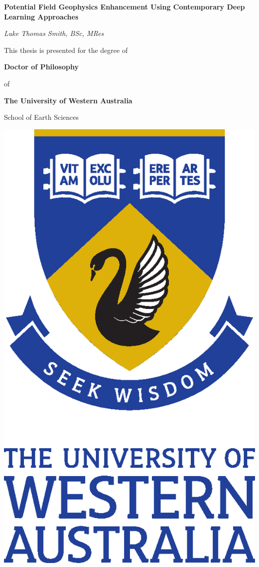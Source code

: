 \documentclass[12pt,a4paper]{report} %
\begin{document}
\begin{titlepage}
    \centering
        
        \vspace*{48 pt}
        {\large\textbf{Potential Field Geophysics Enhancement Using Contemporary Deep Learning Approaches}}

        \vspace{48 pt}
        {\itshape{{\Large Luke Thomas Smith}, BSc, MRes}}

        \vspace{48 pt}
        This thesis is presented for the degree of

        \vspace{14 pt}
        \textbf{Doctor of Philosophy}

        of

        \textbf{The University of Western Australia}
        
        \vspace{14 pt}
        School of Earth Sciences
        
        \vspace{72 pt}
        \includegraphics[scale=0.35]{fig/etc/UWA_FORMAL_PORTRAIT_CMYK}


\end{titlepage}
\end{document}
